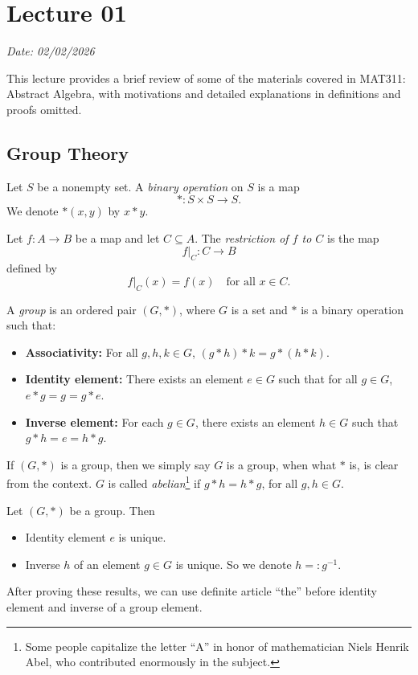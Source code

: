 \chapter{Lecture 01}

\hfill {\footnotesize \textit{Date: 02/02/2026}}

This lecture provides a brief review of some of the materials covered in MAT311: Abstract Algebra, with motivations and detailed explanations in definitions and proofs omitted. 
\section{Group Theory}
\begin{definition}
Let $S$ be a nonempty set. A \emph{binary operation} on $S$ is a map
\[
* : S \times S \longrightarrow S.
\]
We denote \(*(x, y)\) by  \(x * y\).
\end{definition}
\begin{definition}
Let $f : A \longrightarrow B$ be a map and let $C \subseteq A$.  
The \emph{restriction of $f$ to $C$} is the map
\[
f|_C : C \to B
\]
defined by
\[
f|_C(x) = f(x) \quad \text{for all } x \in C.
\]
\end{definition}
\begin{definition}[Group]
    A \emph{group} is an ordered pair \((G,\ast)\), where \(G\) is a set and
\(*\) is a binary operation such that:

\begin{itemize}
  \item \textbf{Associativity:} For all \(g,h,k \in G\),
  \((g \ast h) \ast k = g \ast (h \ast k)\).

  \item \textbf{Identity element:} There exists an element \(e \in G\) such that
  for all \(g \in G\),
  \(e \ast g = g = g \ast e\).

  \item \textbf{Inverse element:} For each \(g \in G\), there exists an element
  \(h \in G\) such that
  \(g \ast h = e = h \ast g\). 
\end{itemize}
\end{definition}
If \((G, \ast)\) is a group, then we simply say \(G\) is a group, when what \(\ast\) is, is clear from the context. \(G\) is called \textit{abelian}\footnote{Some people capitalize the letter ``A'' in honor of mathematician Niels Henrik Abel, who contributed enormously in the subject.} if \(g \ast h = h \ast g\), for all \(g, h \in G\).
\begin{proposition}
    Let \((G, \ast)\) be a group. Then
    \begin{itemize}
        \item Identity element \(e\) is unique.
        \item Inverse \(h\) of an element \(g \in G\) is unique. So we denote \(h =: g^{-1}\).
    \end{itemize}
After proving these results, we can use definite article ``the'' before identity element and inverse of a group element.
\end{proposition}
